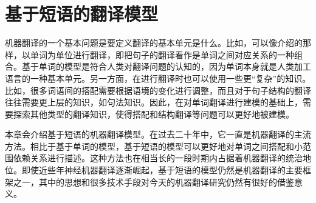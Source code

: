 
%


\renewcommand\figurename{图}%
\renewcommand\tablename{表}%


\chapter{基于短语的翻译模型}

\parinterval 机器翻译的一个基本问题是要定义翻译的基本单元是什么。比如，可以像{\chapterfive}介绍的那样，以单词为单位进行翻译，即把句子的翻译看作是单词之间对应关系的一种组合。基于单词的模型是符合人类对翻译问题的认知的，因为单词本身就是人类加工语言的一种基本单元。另一方面，在进行翻译时也可以使用一些更“复杂”的知识。比如，很多词语间的搭配需要根据语境的变化进行调整，而且对于句子结构的翻译往往需要更上层的知识，如句法知识。因此，在对单词翻译进行建模的基础上，需要探索其他类型的翻译知识，使得搭配和结构翻译等问题可以更好地被建模。

\parinterval 本章会介绍基于短语的机器翻译模型。在过去二十年中，它一直是机器翻译的主流方法。相比于基于单词的模型，基于短语的模型可以更好地对单词之间搭配和小范围依赖关系进行描述。这种方法也在相当长的一段时期内占据着机器翻译的统治地位。即使近些年神经机器翻译逐渐崛起，基于短语的模型仍然是机器翻译的主要框架之一，其中的思想和很多技术手段对今天的机器翻译研究仍然有很好的借鉴意义。


